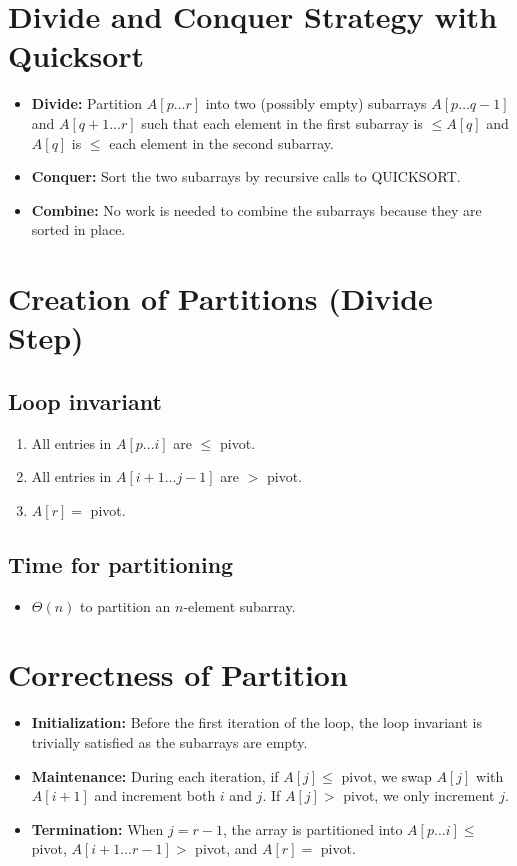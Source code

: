 \documentclass[12pt,openany]{book}
\theoremstyle{definition}
\begin{document}
\section{Divide and Conquer Strategy with Quicksort}
\begin{itemize}
	\item \textbf{Divide:} Partition \( A[p \ldots r] \) into two (possibly empty) subarrays \( A[p \ldots q-1] \) and \( A[q+1 \ldots r] \) such that each element in the first subarray is \( \leq A[q] \) and \( A[q] \) is \( \leq \) each element in the second subarray.
	\item \textbf{Conquer:} Sort the two subarrays by recursive calls to QUICKSORT.
	\item \textbf{Combine:} No work is needed to combine the subarrays because they are sorted in place.
\end{itemize}

\section{Creation of Partitions (Divide Step)}
\subsection{Loop invariant}
\begin{enumerate}
	\item All entries in \( A[p \ldots i] \) are \( \leq \) pivot.
	\item All entries in \( A[i+1 \ldots j-1] \) are \( > \) pivot.
	\item \( A[r] = \) pivot.
\end{enumerate}

\subsection{Time for partitioning}
\begin{itemize}
	\item \( \Theta(n) \) to partition an \( n \)-element subarray.
\end{itemize}

\section{Correctness of Partition}
\begin{itemize}
	\item \textbf{Initialization:} Before the first iteration of the loop, the loop invariant is trivially satisfied as the subarrays are empty.
	\item \textbf{Maintenance:} During each iteration, if \( A[j] \leq \) pivot, we swap \( A[j] \) with \( A[i+1] \) and increment both \( i \) and \( j \). If \( A[j] > \) pivot, we only increment \( j \).
	\item \textbf{Termination:} When \( j = r-1 \), the array is partitioned into \( A[p \ldots i] \leq \) pivot, \( A[i+1 \ldots r-1] > \) pivot, and \( A[r] = \) pivot.
\end{itemize}
\end{document}
